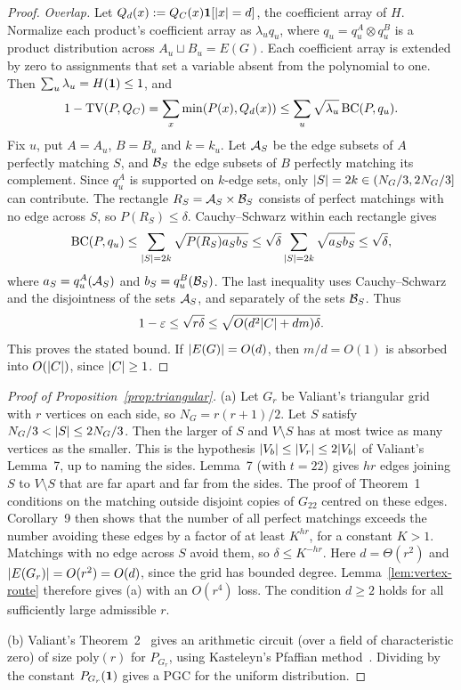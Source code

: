 \begin{proof}
\emph{Overlap.} Let $Q_d(x):=Q_C(x)\mathbf{1}[\lvert x\rvert=d]$, the coefficient array of $H$. Normalize each product's coefficient array as $\lambda_uq_u$, where $q_u=q_u^A\otimes q_u^B$ is a product distribution across $A_u\sqcup B_u=E(G)$. Each coefficient array is extended by zero to assignments that set a variable absent from the polynomial to one. Then $\sum_u\lambda_u=H(\mathbf{1})\le1$, and
\[
  1-\mathrm{TV}(P,Q_C)=\sum_x\min(P(x),Q_d(x))
  \le\sum_u\sqrt{\lambda_u}\,\mathrm{BC}(P,q_u).
\]
Fix $u$, put $A=A_u$, $B=B_u$ and $k=k_u$. Let $\mathcal{A}_S$ be the edge subsets of $A$ perfectly matching $S$, and $\mathcal{B}_S$ the edge subsets of $B$ perfectly matching its complement. Since $q_u^A$ is supported on $k$-edge sets, only $\lvert S\rvert=2k\in(N_G/3,2N_G/3]$ can contribute. The rectangle $R_S=\mathcal{A}_S\times\mathcal{B}_S$ consists of perfect matchings with no edge across $S$, so $P(R_S)\le\delta$. Cauchy--Schwarz within each rectangle gives
\[
  \mathrm{BC}(P,q_u)\le\sum_{\lvert S\rvert=2k}\sqrt{P(R_S)a_Sb_S}
  \le\sqrt\delta\sum_{\lvert S\rvert=2k}\sqrt{a_Sb_S}\le\sqrt\delta,
\]
where $a_S=q_u^A(\mathcal{A}_S)$ and $b_S=q_u^B(\mathcal{B}_S)$. The last inequality uses Cauchy--Schwarz and the disjointness of the sets $\mathcal{A}_S$, and separately of the sets $\mathcal{B}_S$. Thus
\[
  1-\varepsilon\le\sqrt{r\delta}\le\sqrt{O(d^2\lvert C\rvert+dm)\delta}.
\]
This proves the stated bound. If $\lvert E(G)\rvert=O(d)$, then $m/d=O(1)$ is absorbed into $O(\lvert C\rvert)$, since $\lvert C\rvert\ge1$.
\end{proof}

\begin{proof}[Proof of Proposition~\ref{prop:triangular}]
(a) Let $G_r$ be Valiant's triangular grid with $r$ vertices on each side, so $N_G=r(r+1)/2$. Let $S$ satisfy $N_G/3<\lvert S\rvert\le2N_G/3$. Then the larger of $S$ and $V\setminus S$ has at most twice as many vertices as the smaller. This is the hypothesis $\lvert V_b\rvert\le\lvert V_r\rvert\le2\lvert V_b\rvert$ of Valiant's Lemma~7, up to naming the sides. Lemma~7 (with $t=22$) gives $hr$ edges joining $S$ to $V\setminus S$ that are far apart and far from the sides. The proof of Theorem~1~\cite[pp.~311--312]{Valiant80} conditions on the matching outside disjoint copies of $G_{22}$ centred on these edges. Corollary~9 then shows that the number of all perfect matchings exceeds the number avoiding these edges by a factor of at least $K^{hr}$, for a constant $K>1$. Matchings with no edge across $S$ avoid them, so $\delta\le K^{-hr}$. Here $d=\Theta(r^2)$ and $\lvert E(G_r)\rvert=O(r^2)=O(d)$, since the grid has bounded degree. Lemma~\ref{lem:vertex-route} therefore gives (a) with an $O(r^4)$ loss. The condition $d\ge2$ holds for all sufficiently large admissible $r$.

(b) Valiant's Theorem~2~\cite{Valiant80} gives an arithmetic circuit (over a field of characteristic zero) of size $\mathrm{poly}(r)$ for $P_{G_r}$, using Kasteleyn's Pfaffian method~\cite{Kasteleyn61}. Dividing by the constant $P_{G_r}(\mathbf{1})$ gives a PGC for the uniform distribution.
\end{proof}

